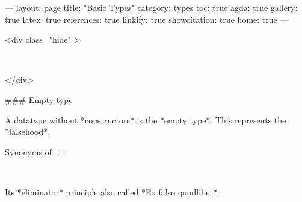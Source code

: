 ---
layout: page
title: "Basic Types"
category: types
toc: true
agda: true
gallery: true
latex: true
references: true
linkify: true
showcitation: true
home: true
---

<div class="hide" >
\begin{code}%
\>[0]\AgdaSymbol{\{-\#}\AgdaSpace{}%
\AgdaSpace{}%
\AgdaSpace{}%
\AgdaSymbol{\#-\}}\<%
\\
\>[0]\AgdaSpace{}%
\AgdaSpace{}%
\AgdaSpace{}%
\<%
\end{code}
</div>

### Empty type

A datatype without *constructors* is the *empty type*. This represents  the *falsehood*.

\begin{code}%
\>[0]\AgdaSpace{}%
\AgdaSpace{}%
\AgdaSymbol{\{}\AgdaSymbol{\}}\AgdaSpace{}%
\AgdaSymbol{:}\AgdaSpace{}%
\AgdaSpace{}%
\AgdaSpace{}%
\<%
\end{code}

Synonyms of ⊥:
\begin{code}%
\>[0]\AgdaSpace{}%
\AgdaSymbol{=}\AgdaSpace{}%
\<%
\\
\>[0]%
\>[6]\AgdaSymbol{=}\AgdaSpace{}%
\<%
\end{code}

Its *eliminator* principle also called *Ex falso quodlibet*:

\begin{code}%
\>[0]\<%
\\
\>[0][@{}l@{\AgdaIndent{0}}]%
\>[2]\AgdaSymbol{:}\AgdaSpace{}%
\AgdaSpace{}%
\AgdaSymbol{\{}\AgdaSpace{}%
\AgdaSymbol{\}}\AgdaSpace{}%
\AgdaSymbol{\{}\AgdaSpace{}%
\AgdaSymbol{:}\AgdaSpace{}%
\AgdaSpace{}%
\AgdaSymbol{\}}\<%
\\
%
\>[2]\AgdaSpace{}%
\AgdaSpace{}%
\AgdaSymbol{\{}\AgdaSymbol{\}}\<%
\\
%
\>[2]\AgdaComment{--------}\<%
\\
%
\>[2]\AgdaSpace{}%
\<%
\\
%
\\[\AgdaEmptyExtraSkip]%
\>[0]\AgdaSpace{}%
\AgdaSymbol{()}\<%
\end{code}

